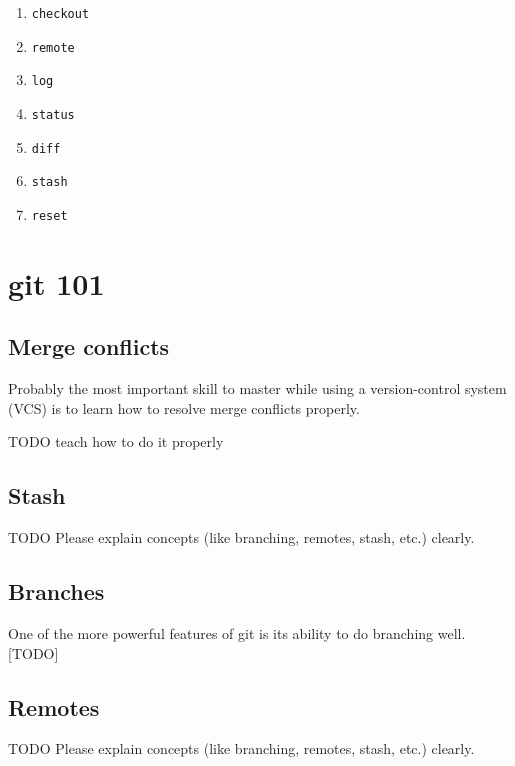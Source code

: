 \documentclass[12pt]{article}
\begin{document}
\begin{enumerate}
\item{\texttt{checkout}}

\item{\texttt{remote}}

\item{\texttt{log}}

\item{\texttt{status}}

\item{\texttt{diff}}

\item{\texttt{stash}}

\item{\texttt{reset}}

\end{enumerate}

\section{git 101}
\subsection{Merge conflicts}
Probably the most important skill to master while using a version-control system (VCS) is to learn how to resolve merge conflicts properly.

TODO teach how to do it properly

\subsection{Stash}
TODO
Please explain concepts (like branching, remotes, stash, etc.) clearly.

\subsection{Branches}
One of the more powerful features of git is its ability to do branching well. [TODO]

\subsection{Remotes}
TODO
Please explain concepts (like branching, remotes, stash, etc.) clearly.
\end{document}
